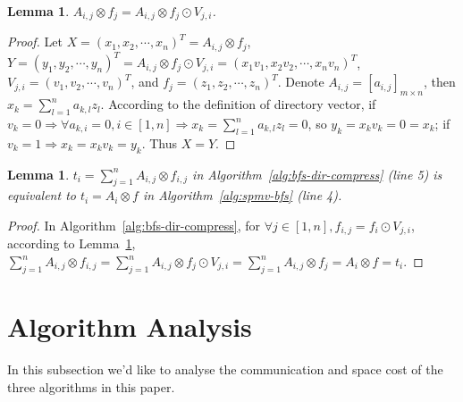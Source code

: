 \documentclass[conference]{IEEEtran}
\newtheorem{lemma}[theorem]{Lemma}
\begin{document}
\begin{lemma}\label{lemma-1}
  $A_{i,j} \otimes f_j = A_{i,j} \otimes f_j \odot V_{j,i} $.
\end{lemma}
\begin{proof}
  Let $X=(x_1,x_2,\cdots,x_n)^T=A_{i,j} \otimes f_j$,
  $Y=(y_1,y_2,\cdots,y_n)^T=A_{i,j} \otimes f_j \odot V_{j,i}
  =(x_1v_1,x_2v_2,\cdots,x_nv_n)^T$,$V_{j,i} = (v_1,v_2,\cdots,v_n)^T$, and
  $f_j=(z_1,z_2,\cdots,z_n)^T$. Denote $A_{i,j}=[a_{i,j}]_{m \times n}$, then
  $x_k = \sum_{l=1}^{n} a_{k,l}z_l$. According to the definition of directory
  vector, if $v_k = 0 \Rightarrow \forall a_{k,i}=0, i\in[1,n] \Rightarrow x_k
  = \sum_{l=1}^{n} a_{k,l}z_{l} = 0$, so $y_k = x_kv_k = 0 = x_k$; if $v_k = 1
  \Rightarrow x_k = x_kv_k = y_k$. Thus $X = Y$.
\end{proof}

\begin{lemma} \label{lemma-2} $t_{i} = \sum_{j=1}^{n} A_{i,j} \otimes f_{i,j}
  $ in Algorithm~\ref{alg:bfs-dir-compress} (line 5) is equivalent to $t_{i} =
  A_i \otimes f$ in Algorithm~\ref{alg:spmv-bfs} (line 4).
\end{lemma}
\begin{proof}
  In Algorithm~\ref{alg:bfs-dir-compress}, for $\forall j \in [1,n], f_{i,j} =
  f_i \odot V_{j,i}$, according to Lemma~\ref{lemma-1}, $\sum_{j=1}^{n}
  A_{i,j} \otimes f_{i,j} = \sum_{j=1}^{n}A_{i,j} \otimes f_j \odot
  V_{j,i}=\sum_{j=1}^{n} A_{i,j} \otimes f_j = A_i \otimes f = t_i$.
\end{proof}




















\section{Algorithm Analysis}
\label{sec:ana}
In this subsection we'd like to analyse the communication and space cost of
the three algorithms in this paper.
\end{document}
